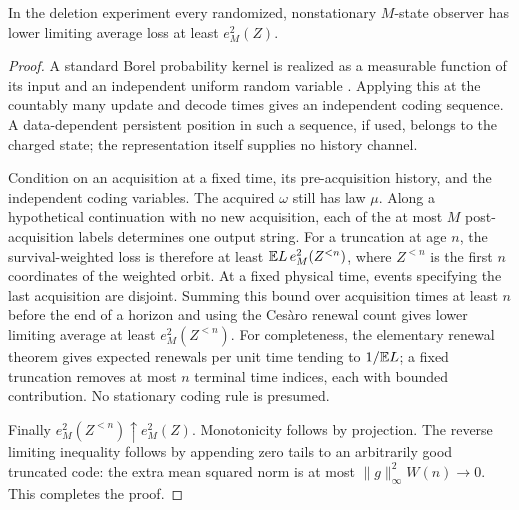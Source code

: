 \begin{lemma}\label{lem:v7-renewal-converse}
In the deletion experiment every randomized, nonstationary $M$-state
observer has lower limiting average loss at least $e_M^2(Z)$.
\end{lemma}
\begin{proof}
A standard Borel probability kernel is realized as a measurable function
of its input and an independent uniform random variable
\cite{Kallenberg2021}. Applying this at the countably many update and
decode times gives an independent coding sequence. A data-dependent
persistent position in such a sequence, if used, belongs to the charged
state; the representation itself supplies no history channel.

Condition on an acquisition at a fixed time, its pre-acquisition history,
and the independent coding variables. The acquired $\omega$ still has
law $\mu$. Along a hypothetical continuation with no new acquisition,
each of the at most $M$ post-acquisition labels determines one output
string. For a truncation at age $n$, the survival-weighted loss is
therefore at least
$\mathbb E L\,e_M^2(Z^{<n})$, where $Z^{<n}$ is the first $n$ coordinates
of the weighted orbit. At a fixed physical time, events specifying the
last acquisition are disjoint. Summing this bound over acquisition times
at least $n$ before the end of a horizon and using the Ces\`aro renewal
count gives lower limiting average at least $e_M^2(Z^{<n})$.
For completeness, the elementary renewal theorem gives expected renewals
per unit time tending to $1/\mathbb E L$; a fixed truncation removes at most
$n$ terminal time indices, each with bounded contribution. No stationary
coding rule is presumed.

Finally $e_M^2(Z^{<n})\uparrow e_M^2(Z)$. Monotonicity follows by
projection. The reverse limiting inequality follows by appending zero
tails to an arbitrarily good truncated code: the extra mean squared
norm is at most $\|g\|_\infty^2W(n)\to0$. This completes the proof.
\end{proof}

